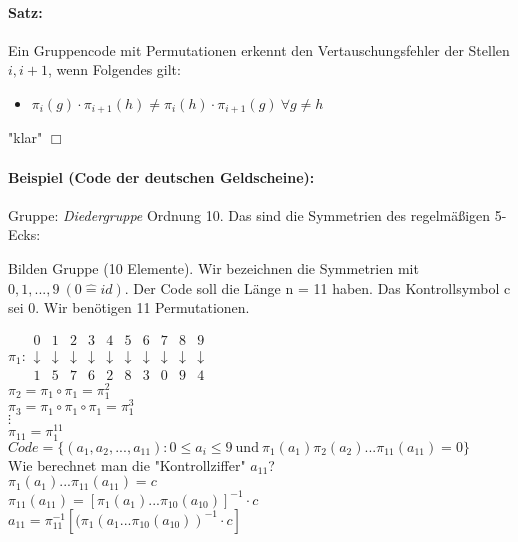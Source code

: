 \paragraph{Satz:}
Ein Gruppencode mit Permutationen erkennt den Vertauschungsfehler der Stellen $i, i+1$, wenn Folgendes gilt:
\begin{itemize}
\item $\pi_i(g) \cdot  \pi_{i+1}(h) \neq \pi_i(h) \cdot  \pi_{i+1}(g) \ \forall g \neq h$
\end{itemize}
"klar" $\Box$

\paragraph{Beispiel (Code der deutschen Geldscheine):}
Gruppe: \textit{Diedergruppe} Ordnung 10. Das sind die Symmetrien des regelmäßigen 5-Ecks:


Bilden Gruppe (10 Elemente). Wir bezeichnen die Symmetrien mit $0,1,...,9 \ (0 \widehat{=} id)$. Der Code soll die Länge n = 11 haben. Das Kontrollsymbol c sei 0. Wir benötigen 11 Permutationen. 

$ \pi_1:
\begin{array}{cccccccccc}
0 & 1 & 2 & 3 & 4 & 5 & 6 & 7 & 8 & 9 \\ 
\downarrow & \downarrow & \downarrow & \downarrow & \downarrow & \downarrow & \downarrow & \downarrow & \downarrow & \downarrow \\ 
1 & 5 & 7 & 6 & 2 & 8 & 3 & 0 & 9 & 4
\end{array} $
\\
$ \pi_2 = \pi_1 \circ \pi_1 = \pi_1^2 $ \\
$ \pi_3 = \pi_1 \circ \pi_1 \circ \pi_1 = \pi_1^3 $ \\
$ \vdots $ \\
$ \pi_{11} = \pi_1^{11} $ \\
$ Code = \{(a_1,a_2,...,a_{11}) \colon 0 \le a_i \le 9 \ \mbox{und} \ \pi_1(a_1) \pi_2(a_2) ... \pi_{11}(a_{11}) = 0 \} $ \\ 
Wie berechnet man die "Kontrollziffer" $a_{11}$?\\
$\pi_1(a_1) ... \pi_{11}(a_{11}) = c $\\
$\pi_{11}(a_{11}) = [\pi_1(a_1) ... \pi_{10}(a_{10})]^{-1} \cdot  c$\\
$a_{11}=\pi_{11}^{-1} [(\pi_{1}(a_{1} ... \pi_{10}(a_{10}))^{-1} \cdot  c]$

